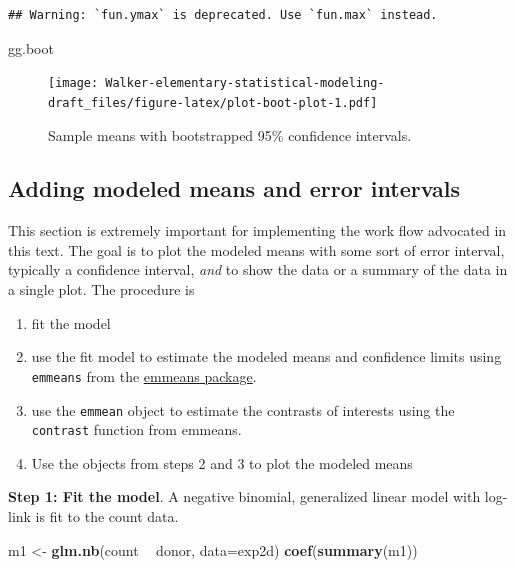 \documentclass[]{book}
\newenvironment{Shaded}{\begin{snugshade}}{\end{snugshade}}
\newcommand{\DataTypeTok}[1]{\textcolor[rgb]{0.13,0.29,0.53}{#1}}
\newcommand{\KeywordTok}[1]{\textcolor[rgb]{0.13,0.29,0.53}{\textbf{#1}}}
\newcommand{\NormalTok}[1]{#1}
\newcommand{\OperatorTok}[1]{\textcolor[rgb]{0.81,0.36,0.00}{\textbf{#1}}}
\newcommand{\StringTok}[1]{\textcolor[rgb]{0.31,0.60,0.02}{#1}}
\providecommand{\tightlist}{%
  \setlength{\itemsep}{0pt}\setlength{\parskip}{0pt}}
\begin{document}
\begin{verbatim}
## Warning: `fun.ymax` is deprecated. Use `fun.max` instead.
\end{verbatim}

\begin{Shaded}
\begin{Highlighting}[]
\NormalTok{gg.boot}
\end{Highlighting}
\end{Shaded}

\begin{figure}
\centering
\texttt{[image: Walker-elementary-statistical-modeling-draft\_files/figure-latex/plot-boot-plot-1.pdf]}
\caption{\label{fig:plot-boot-plot}Sample means with bootstrapped 95\% confidence intervals.}
\end{figure}

\hypertarget{adding-modeled-means-and-error-intervals}{%
\subsection{Adding modeled means and error intervals}\label{adding-modeled-means-and-error-intervals}}

This section is extremely important for implementing the work flow advocated in this text. The goal is to plot the modeled means with some sort of error interval, typically a confidence interval, \emph{and} to show the data or a summary of the data in a single plot. The procedure is

\begin{enumerate}
\def\labelenumi{\arabic{enumi}.}
\tightlist
\item
  fit the model
\item
  use the fit model to estimate the modeled means and confidence limits using \texttt{emmeans} from the \href{https://cran.r-project.org/web/packages/emmeans/index.html}{emmeans package}.
\item
  use the \texttt{emmean} object to estimate the contrasts of interests using the \texttt{contrast} function from emmeans.
\item
  Use the objects from steps 2 and 3 to plot the modeled means
\end{enumerate}

\textbf{Step 1: Fit the model}. A negative binomial, generalized linear model with log-link is fit to the count data.

\begin{Shaded}
\begin{Highlighting}[]
\NormalTok{m1 <-}\StringTok{ }\KeywordTok{glm.nb}\NormalTok{(count }\OperatorTok{~}\StringTok{ }\NormalTok{donor, }\DataTypeTok{data=}\NormalTok{exp2d)}
\KeywordTok{coef}\NormalTok{(}\KeywordTok{summary}\NormalTok{(m1))}
\end{Highlighting}
\end{Shaded}
\end{document}
